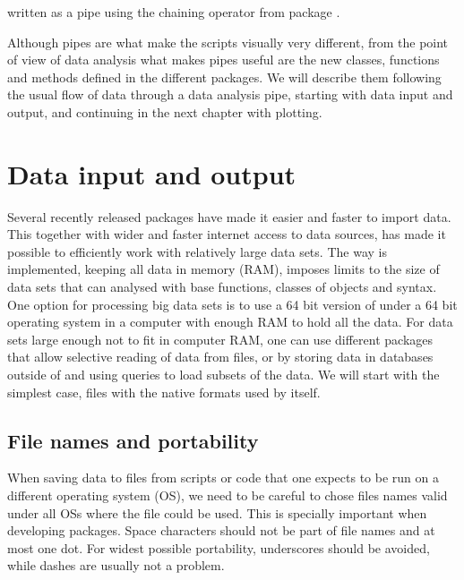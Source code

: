 \documentclass[krantz2]{krantz}\usepackage{knitr}%
\begin{document}
written as a pipe using the chaining operator from package .
\begin{knitrout}\footnotesize
{}\color{fgcolor}
\end{knitrout}

Although pipes are what make the scripts visually very different, from the point of view of data analysis what makes pipes useful are the new classes, functions and methods defined in the different  packages. We will describe them following the usual flow of data through a data analysis pipe, starting with data input and output, and continuing in the next chapter with plotting.

\section{Data input and output}\label{sec:data:io}

Several recently released \Rlang packages have made it easier and faster to import data. This together with wider and faster internet access to data sources, has made it possible to efficiently work with relatively large data sets. The way \Rlang is implemented, keeping all data in memory (RAM), imposes limits to the size of data sets that can analysed with base \Rlang functions, classes of objects and syntax. One option for processing big data sets is to use a 64 bit version of \Rlang under a 64 bit operating system in a computer with enough RAM to hold all the data. For data sets large enough not to fit in computer RAM, one can use different packages that allow selective reading of data from files, or by storing data in databases outside of \Rlang and using queries to load subsets of the data. We will start with the simplest case, files with the native formats used by \Rlang itself.

\subsection{File names and portability}\label{sec:files:filenames}

When saving data to files from scripts or code that one expects to be run on a different operating system (OS), we need to be careful to chose files names valid under all OSs where the file could be used. This is specially important when developing \Rlang packages. Space characters should not be part of file names and at most one dot. For widest possible portability, underscores should be avoided, while dashes are usually not a problem.
\end{document}
